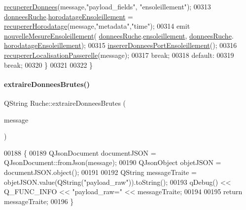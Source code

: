 \begin{DoxyCode}
      \hyperlink{class_ruche_a68e487fc714c68b7d4f761cad9122b39}{recupererDonnees}(message,\textcolor{stringliteral}{"payload\_fields"}, \textcolor{stringliteral}{"ensoleillement"});
00313             \hyperlink{class_ruche_a1526bfa78f03e0710ad16f880a40c15f}{donneesRuche}.\hyperlink{struct_donnees_ruche_ae1b5a2502017455f8fbd95bdab935fd1}{horodatageEnsoleillement} = 
      \hyperlink{class_ruche_a072193021274bb4308776934c35f7443}{recupererHorodatage}(message,\textcolor{stringliteral}{"metadata"},\textcolor{stringliteral}{"time"});
00314             emit \hyperlink{class_ruche_aa9eaf4dd1b60e525c7d1bb5319130ce1}{nouvelleMesureEnsoleillement}(
      \hyperlink{class_ruche_a1526bfa78f03e0710ad16f880a40c15f}{donneesRuche}.\hyperlink{struct_donnees_ruche_adfa6aee15b2a96b968e558ac14e0f2de}{ensoleillement}, \hyperlink{class_ruche_a1526bfa78f03e0710ad16f880a40c15f}{donneesRuche}.
      \hyperlink{struct_donnees_ruche_ae1b5a2502017455f8fbd95bdab935fd1}{horodatageEnsoleillement});
00315             \hyperlink{class_ruche_ad21de5f7d48195be0658f52c55f34183}{insererDonneesPortEnsoleillement}();
00316             \hyperlink{class_ruche_abdb0503e660631a0a9d2ed7177918341}{recupererLocalisationPasserelle}(message);
00317             \textcolor{keywordflow}{break};
00318         \textcolor{keywordflow}{default}:
00319             \textcolor{keywordflow}{break};
00320     \}
00321 
00322 \}
\end{DoxyCode}
\mbox{\label{class_ruche_a97d167a57144e9d923007b732d4e6091}} 
\paragraph{\texorpdfstring{extraire\+Donnees\+Brutes()}{extraireDonneesBrutes()}}
{\footnotesize\ttfamily Q\+String Ruche\+::extraire\+Donnees\+Brutes (\begin{DoxyParamCaption}\item[{const Q\+Byte\+Array \&}]{message }\end{DoxyParamCaption})\hspace{0.3cm}{\ttfamily [private]}}


\begin{DoxyCode}
00188 \{
00189     QJsonDocument documentJSON = QJsonDocument::fromJson(message);
00190     QJsonObject objetJSON = documentJSON.object();
00191 
00192     QString messageTraite = objetJSON.value(QString(\textcolor{stringliteral}{"payload\_raw"})).toString();
00193     qDebug() << Q\_FUNC\_INFO << \textcolor{stringliteral}{"payload\_raw="} << messageTraite;
00194 
00195     \textcolor{keywordflow}{return} messageTraite;
00196 \}
\end{DoxyCode}
\mbox{\label{class_ruche_a309bff2fac1f8562da0f5f1a5d75c907}} 
